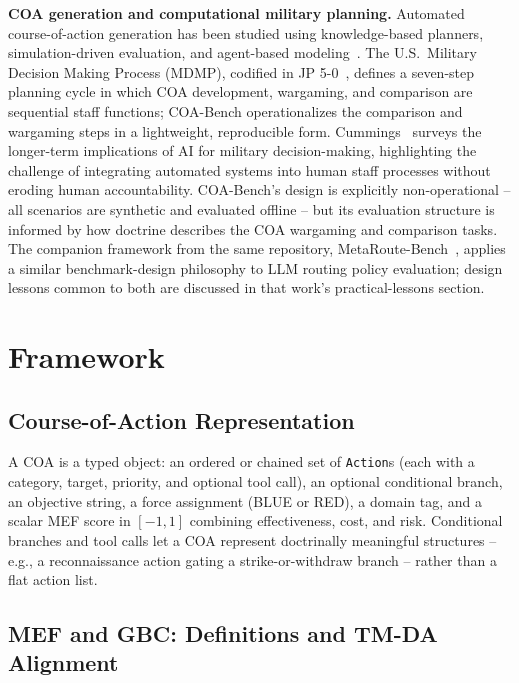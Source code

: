 \documentclass[sigconf]{acmart}
\begin{document}
\textbf{COA generation and computational military planning.} Automated course-of-action generation has been studied using knowledge-based planners, simulation-driven evaluation, and agent-based modeling~\cite{sokolowski2010military}. The U.S.\ Military Decision Making Process (MDMP), codified in JP 5-0~\cite{jp50}, defines a seven-step planning cycle in which COA development, wargaming, and comparison are sequential staff functions; COA-Bench operationalizes the comparison and wargaming steps in a lightweight, reproducible form. Cummings~\cite{cummings2017artificial} surveys the longer-term implications of AI for military decision-making, highlighting the challenge of integrating automated systems into human staff processes without eroding human accountability. COA-Bench's design is explicitly non-operational -- all scenarios are synthetic and evaluated offline -- but its evaluation structure is informed by how doctrine describes the COA wargaming and comparison tasks. The companion framework from the same repository, MetaRoute-Bench~\cite{vidra2026metaroute}, applies a similar benchmark-design philosophy to LLM routing policy evaluation; design lessons common to both are discussed in that work's practical-lessons section.

\section{Framework}

\subsection{Course-of-Action Representation}

A COA is a typed object: an ordered or chained set of \texttt{Action}s (each with a category, target, priority, and optional tool call), an optional conditional branch, an objective string, a force assignment (BLUE or RED), a domain tag, and a scalar MEF score in $[-1, 1]$ combining effectiveness, cost, and risk. Conditional branches and tool calls let a COA represent doctrinally meaningful structures -- e.g., a reconnaissance action gating a strike-or-withdraw branch -- rather than a flat action list.

\subsection{MEF and GBC: Definitions and TM-DA Alignment}
\label{sec:tmda}
\end{document}
